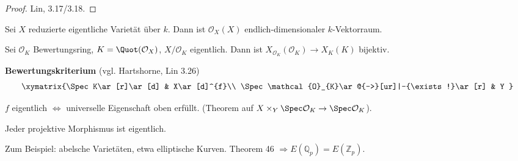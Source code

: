 \begin{proof}
  Lin, 3.17/3.18.
\end{proof}
\begin{cor}
  Sei $X$ reduzierte eigentliche Varietät über $k$. Dann ist $\mathcal{O}_{X}(X)$
  endlich-dimensionaler $k$-Vektorraum.
\end{cor}

\begin{thm}[45]
  Sei $\mathcal{O}_{K}$ Bewertungsring, $K=\Quot(\mathcal{O}_{X})$,
  $X/\mathcal{O}_{K}$ eigentlich. Dann ist $X_{\mathcal{O}_{K}}(\mathcal{O}_{K})\rightarrow X_{K}(K)$
  bijektiv.
\end{thm}

\textbf{Bewertungskriterium }(vgl. Hartshorne, Lin 3.26)
\[
  \xymatrix{\Spec K\ar[r]\ar[d] & X\ar[d]^{f}\\
    \Spec\mathcal{O}_{K}\ar@{-->}[ur]|-{\exists!}\ar[r] & Y
  }
\]

$f$ eigentlich $\Longleftrightarrow$ universelle Eigenschaft oben
erfüllt. (Theorem auf $X\times_{Y}\Spec\mathcal{O}_{K}\rightarrow\Spec\mathcal{O}_{K}$).
\begin{thm}
  Jeder projektive Morphismus ist eigentlich.
\end{thm}

Zum Beispiel: abelsche Varietäten, etwa elliptische Kurven. Theorem
46 $\Longrightarrow E(\mathbb{Q}_{p})=E(\mathbb{Z}_{p})$.
